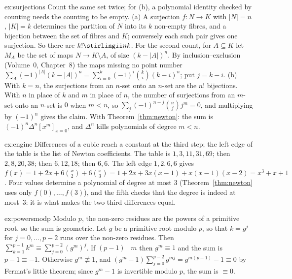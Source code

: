 \begin{solution}{ex:surjections}
\idea Count the same set twice; for (b), a polynomial identity checked by counting needs the counting to be empty.
\writeup (a) A surjection $f:N\to K$ with $|N|=n$, $|K|=k$ determines the partition of $N$ into its $k$ non-empty fibres,
and a bijection between the set of fibres and $K$; conversely each such pair gives one surjection. So there are
$k!\stirlingii nk$. For the second count, for $A\subseteq K$ let $M_A$ be the set of maps $N\to K\setminus A$, of size
$(k-|A|)^n$. By inclusion--exclusion (Volume~0, Chapter~8) the maps missing no point number
$\sum_{A}(-1)^{|A|}(k-|A|)^n=\sum_{i=0}^k(-1)^i\binom ki(k-i)^n$; put $j=k-i$.
(b) With $k=n$, the surjections from an $n$-set onto an $n$-set are the $n!$ bijections. With $n$ in place of $k$ and $m$
in place of $n$, the number of surjections from an $m$-set onto an $n$-set is $0$ when $m<n$, so
$\sum_j(-1)^{n-j}\binom njj^m=0$, and multiplying by $(-1)^n$ gives the claim. With Theorem~\ref{thm:newton}: the sum
is $(-1)^n\Delta^n[x^m]_{x=0}$, and $\Delta^n$ kills polynomials of degree $m<n$.
\end{solution}

\begin{solution}{ex:engine}
\idea Differences of a cubic reach a constant at the third step; the left edge of the table is the list of Newton
coefficients.
\writeup The table is $1,3,11,31,69$; then $2,8,20,38$; then $6,12,18$; then $6,6$. The left edge $1,2,6,6$ gives
$f(x)=1+2x+6\binom x2+6\binom x3=1+2x+3x(x-1)+x(x-1)(x-2)=x^3+x+1$. Four values determine a polynomial of degree at most
$3$ (Theorem~\ref{thm:newton} uses only $f(0),\dots,f(3)$), and the fifth checks that the degree is indeed at most~$3$:
it is what makes the two third differences equal.
\end{solution}

\begin{solution}{ex:powersmodp}
\idea Modulo $p$, the non-zero residues are the powers of a primitive root, so the sum is geometric.
\writeup Let $g$ be a primitive root modulo $p$, so that $k=g^j$ for $j=0,\dots,p-2$ runs over the non-zero residues.
Then $\sum_{k=1}^{p-1}k^m\equiv\sum_{j=0}^{p-2}(g^m)^j$. If $(p-1)\mid m$ then $g^m\equiv1$ and the sum is $p-1\equiv-1$.
Otherwise $g^m\not\equiv1$, and $(g^m-1)\sum_{j=0}^{p-2}g^{mj}=g^{m(p-1)}-1\equiv0$ by Fermat's little theorem; since
$g^m-1$ is invertible modulo $p$, the sum is $\equiv0$.
\end{solution}

